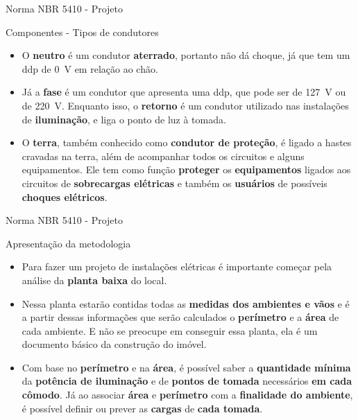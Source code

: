 \begin{frame}{Norma NBR 5410 - Projeto}
	\begin{block}{Componentes - Tipos de condutores}
		\begin{itemize}
			\item O \textbf{neutro} é um condutor \textbf{aterrado}, portanto não dá choque, já que tem um ddp de \SI{0}{\volt} em relação ao chão.
			\item Já a \textbf{fase} é um condutor que apresenta uma ddp, que pode ser de \SI{127}{\volt} ou de \SI{220}{\volt}. Enquanto isso, o \textbf{retorno} é um condutor utilizado nas instalações de \textbf{iluminação}, e liga o ponto de luz à tomada.
			\item O \textbf{terra}, também conhecido como \textbf{condutor de proteção}, é ligado a hastes cravadas na terra, além de acompanhar todos os circuitos e alguns equipamentos. Ele tem como função \textbf{proteger} os \textbf{equipamentos} ligados aos circuitos de \textbf{sobrecargas elétricas} e também os \textbf{usuários} de possíveis \textbf{choques elétricos}.
		\end{itemize}
	\end{block}
\end{frame}


\begin{frame}{Norma NBR 5410 - Projeto}
	\begin{block}{Apresentação da metodologia}
		\begin{itemize}
			\item Para fazer um projeto de instalações elétricas é importante começar pela análise da \textbf{planta baixa} do local.
			\item Nessa planta estarão contidas todas as \textbf{medidas dos ambientes e vãos} e é a partir dessas informações que serão calculados o \textbf{perímetro} e a \textbf{área} de cada ambiente. E não se preocupe em conseguir essa planta, ela é um documento básico da construção do imóvel.
			\item Com base no \textbf{perímetro} e na \textbf{área}, é possível saber a \textbf{quantidade mínima} da \textbf{potência de iluminação} e de \textbf{pontos de tomada} necessários \textbf{em cada cômodo}. Já ao associar \textbf{área} e \textbf{perímetro} com a \textbf{finalidade do ambiente}, é possível definir ou prever as \textbf{cargas} de \textbf{cada tomada}.
		\end{itemize}
	\end{block}
\end{frame}



